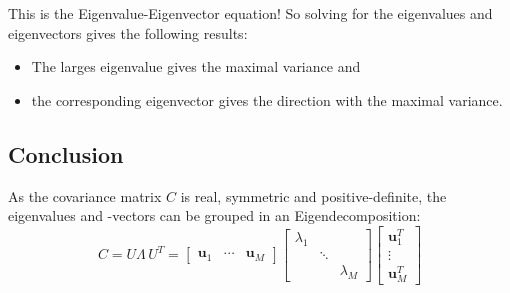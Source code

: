 \documentclass[a4paper, 11pt, accentcolor = tud3b]{tudreport}
\renewcommand{\vec}[1]{\mathbf{#1}}
\begin{document}
					This is the Eigenvalue-Eigenvector equation! So solving for the eigenvalues and eigenvectors gives the following results:
					\begin{itemize}
						\item The larges eigenvalue gives the maximal variance and
						\item the corresponding eigenvector gives the direction with the maximal variance.
					\end{itemize}
			
			\subsection{Conclusion}
				As the covariance matrix \(C\) is real, symmetric and positive-definite, the eigenvalues and -vectors can be grouped in an Eigendecomposition:
				\begin{equation}
					C = U \Lambda \, U^T =
					\begin{bmatrix} \vec{u}_1 & \cdots & \vec{u}_M \end{bmatrix}
					\begin{bmatrix}
						\lambda_1 &        &  \\
						          & \ddots &  \\
						          &        & \lambda_M
					\end{bmatrix}
					\begin{bmatrix} \vec{u}_1^T \\ \vdots \\ \vec{u}_M^T \end{bmatrix}
				\end{equation}
				
\end{document}
